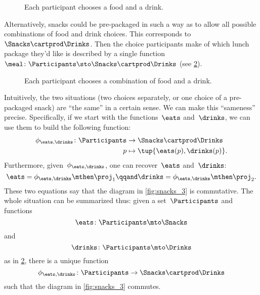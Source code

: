 \begin{figure}[h!]
    \centering
    \caption{Each participant chooses a food and a drink.}
    \label{fig:snacks_1}
\end{figure}

Alternatively, snacks could be pre-packaged in such a way as to allow all possible combinations of food and drink choices.
This corresponds to~$\Snacks\cartprod \Drinks$.
Then the choice participants make of which lunch package they'd like is described by a single function~$\meal \colon \Participants\sto \Snacks\cartprod \Drinks$ (see \cref{fig:snacks_2}).

\begin{figure}[h!]
    \centering
    \caption{Each participant chooses a combination of food and a drink. \label{fig:snacks_2}}
\end{figure}

Intuitively, the two situations (two choices separately, or one choice of a pre-packaged snack) are ``the same'' in a certain sense.
We can make this ``sameness'' precise.
Specifically, if we start with the functions~$\eats$ and~$\drinks$, we can use them to build the following function:
\begin{equation}
    \label{eq:snacks-building-univ-map}
    \begin{aligned}
        \phi_{\eats,\drinks}\colon \Participants & \to \Snacks\cartprod \Drinks \\
        p                                        & \mapsto \tup{\eats(p),\drinks(p)}.
    \end{aligned}
\end{equation}
Furthermore, given~$\phi_{\eats,\drinks}$, one can recover~$\eats$ and~$\drinks$:
\begin{equation}
    \label{eq:snacks-proj-univ-map}
    \eats =\phi_{\eats,\drinks}\mthen \proj_1 \qqand \drinks=\phi_{\eats,\drinks}\mthen \proj_2.
\end{equation}
These two equations say that the diagram in \cref{fig:snacks_3} is commutative.
The whole situation can be summarized thus: given a set~$\Participants$ and functions
\begin{equation*}
    \eats\colon \Participants \mto \Snacks
\end{equation*}
and
\begin{equation*}
    \drinks\colon \Participants \mto \Drinks
\end{equation*}
as in \cref{fig:snacks_2}, there is a unique function
\begin{equation}
    \label{eq:snacks-unique-univ-map}
    \phi_{\eats,\drinks} \colon \Participants \to \Snacks \cartprod \Drinks
\end{equation}
such that the diagram in \cref{fig:snacks_3} commutes.

